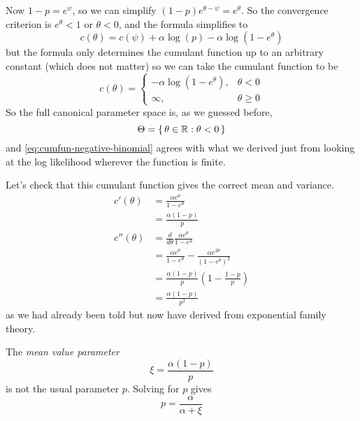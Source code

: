 Now $1 - p = e^\psi$, so we can simplify $(1-p) e^{\theta - \psi} = e^\theta$.
So the convergence criterion is $e^\theta < 1$ or $\theta < 0$, and the
formula simplifies to
$$
   c(\theta)
   =
   c(\psi)
   +
   \alpha \log(p)
   -
   \alpha \log \left( 1 - e^\theta \right)
$$
but the formula only determines the cumulant function up to an arbitrary
constant (which does not matter) so we can take the cumulant function to be
\begin{equation} \label{eq:cumfun-negative-binomial}
   c(\theta)
   =
   \begin{cases}
   - \alpha \log(1 - e^\theta), & \theta < 0
   \\
   \infty, & \theta \ge 0
   \end{cases}
\end{equation}
So the full canonical parameter space is, as we guessed before,
\begin{equation} \label{eq:canonical-parameter-space-negative-binomial}
   \Theta = \{\,  \theta \in \mathbb{R} : \theta < 0  \,\}
\end{equation}
and \eqref{eq:cumfun-negative-binomial} agrees with what we derived just
from looking at the log likelihood wherever the function is finite.

Let's check that this cumulant function gives the correct mean and variance.
\begin{align*}
   c'(\theta)
   & =
   \frac{\alpha e^\theta}{1 - e^\theta}
   \\
   & =
   \frac{\alpha (1 - p)}{p}
   \\
   c''(\theta)
   & =
   \frac{d}{d \theta}
   \frac{\alpha e^\theta}{1 - e^\theta}
   \\
   & =
   \frac{\alpha e^\theta}{1 - e^\theta}
   -
   \frac{\alpha e^{2 \theta}}{(1 - e^\theta)^2}
   \\
   & =
   \frac{\alpha (1 - p)}{p}
   \left(
   1
   -
   \frac{1 - p}{p}
   \right)
   \\
   & =
   \frac{\alpha (1 - p)}{p^2}
\end{align*}
as we had already been told but now have derived
from exponential family theory.

The \emph{mean value parameter}
\begin{equation} \label{eq:negative-binomial-mean-value}
   \xi = \frac{\alpha (1 - p)}{p}
\end{equation}
is not the usual parameter $p$.  Solving for $p$ gives
\begin{equation} \label{eq:negative-binomial-usual}
   p = \frac{\alpha}{\alpha + \xi}
\end{equation}

